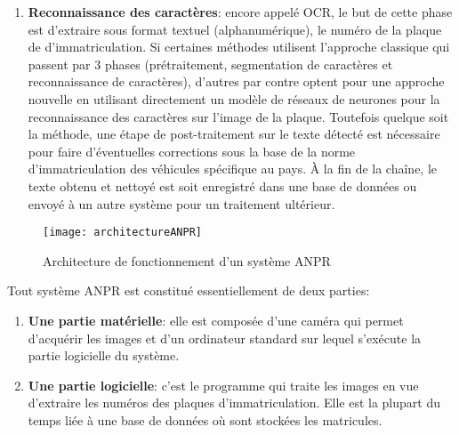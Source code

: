 \begin{enumerate}
    \item \textbf{Reconnaissance des caractères}: encore appelé OCR, le but de cette phase est d’extraire sous format textuel (alphanumérique), le numéro de la plaque de d’immatriculation. Si certaines méthodes \cite{krimMaster, 10.1155/2018/6737314} utilisent l'approche classique qui passent par 3 phases (prétraitement, segmentation de caractères et reconnaissance de caractères), d’autres \cite{Alahyane2021OpenDF, doi:10.1177/0361198120954202} par contre optent pour une approche nouvelle en utilisant directement un modèle de réseaux de neurones pour la reconnaissance des caractères sur l'image de la plaque. Toutefois quelque soit la méthode, une étape de post-traitement sur le texte détecté est nécessaire pour faire d'éventuelles corrections sous la base de la norme d’immatriculation des véhicules spécifique au pays. À la fin de la chaîne, le texte obtenu et nettoyé est soit enregistré dans une base de données ou envoyé à un autre système pour un traitement ultérieur.

\end{enumerate}

\begin{figure}[H]
    \centering
    \texttt{[image: architectureANPR]}
    \caption{Architecture de fonctionnement d'un système ANPR}
\end{figure}
Tout système ANPR est constitué essentiellement de deux parties:
    \begin{enumerate}
        \item \textbf{Une partie matérielle}: elle est composée d’une caméra qui permet d’acquérir les images et d’un ordinateur standard sur lequel s'exécute la partie logicielle du système.
        \item \textbf{Une partie logicielle}: c’est le programme qui traite les images en vue d’extraire les numéros des plaques d’immatriculation. Elle est la plupart du temps liée à une base de données où sont stockées les matricules.
    \end{enumerate}